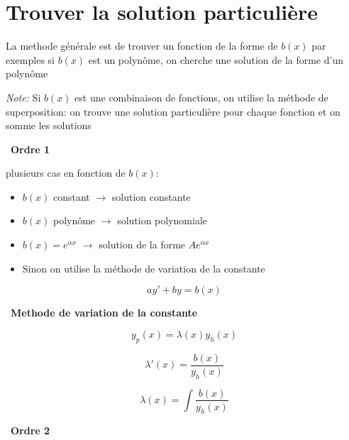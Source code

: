 \documentclass{article}
\begin{document}
\section*{Trouver la solution particulière}

La methode générale est de trouver un fonction de la forme de $b(x)$
par exemples si $b(x)$ est un polynôme, on cherche une solution de la forme d'un polynôme

\textit{Note:} Si $b(x)$ est une combinaison de fonctions, on utilise la méthode de superposition:
on trouve une solution particulière pour chaque fonction et on somme les solutions

\hrulefill \,
\textbf{Ordre 1}
\hrulefill

plusieurs cas en fonction de $b(x)$:
\begin{itemize}
    \item[--] $b(x) $ constant $ \longrightarrow $ solution constante
    \item[--] $b(x) $ polynôme $ \longrightarrow $ solution polynomiale
    \item[--] $b(x) = e^{\alpha x} $ $ \longrightarrow $ solution de la forme $Ae^{\alpha x}$
    \item[--] Sinon on utilise la méthode de variation de la constante
\end{itemize}

\begin{equation*}
    ay' + by = b(x)
\end{equation*}



\hrulefill \,
\textbf{Methode de variation de la constante}
\hrulefill

\begin{equation*}
    y_p(x) = \lambda(x)y_h(x)
\end{equation*}

\begin{equation*}
    \lambda'(x) = \frac{b(x)}{y_h(x)}
\end{equation*}

\begin{equation*}
    \lambda(x) = \int \frac{b(x)}{y_h(x)}
\end{equation*}


\hrulefill \,
\textbf{Ordre 2}
\hrulefill 
\end{document}
